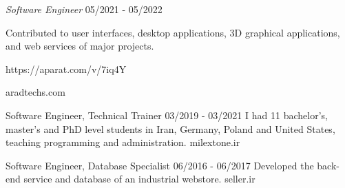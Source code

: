 \documentclass[a4paper,12pt]{memoir} %
\begin{document}

\Sep %


\clearpage %

\userinformation %

\framebreak %






{\textit{Software Engineer}}
{05/2021 - 05/2022}
{Contributed to user interfaces, desktop applications, 3D graphical applications, and web services of major projects.\par https://aparat.com/v/7iq4Y}
{aradtechs.com}


{Software Engineer, Technical Trainer}
{03/2019 - 03/2021}
{I had 11 bachelor's, master's and PhD level students in Iran, Germany, Poland and United States, teaching programming and administration.}
{milextone.ir}


{Software Engineer, Database Specialist}
{06/2016 - 06/2017}
{Developed the back-end service and database of an industrial webstore.}
{seller.ir}


\Sep %
\end{document}

